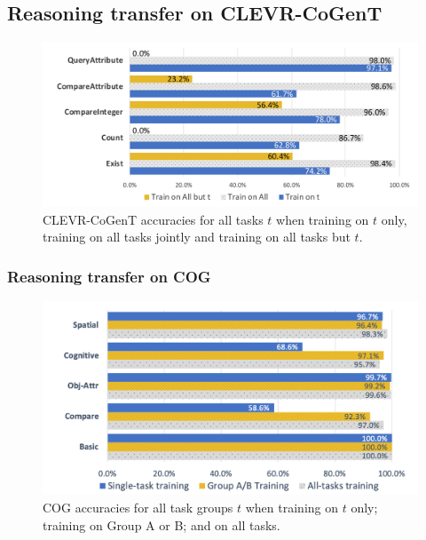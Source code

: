 \newpage
\subsection{Reasoning transfer on CLEVR-CoGenT}

\begin{figure}[htbp]
	\centering
	\includegraphics[width=\columnwidth]{../results/CoGenT_results.pdf}
	\caption{CLEVR-CoGenT accuracies for all tasks $t$ when training on $t$ only, training on all tasks jointly and training on all tasks but $t$.} %
	\label{fig:CoGenT-results}
\end{figure}



\newpage
\subsubsection{Reasoning transfer on COG}


\begin{figure}[htbp]
	\centering
	\includegraphics[width=\columnwidth]{../results/COG_reasoning_transfer_v3}
	\caption{COG accuracies for all task groups $t$ when training on $t$ only; training on Group A or B; and on all tasks.}
	\label{fig:COG-reasoning-results}
\end{figure}



